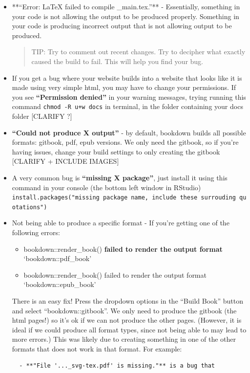 \documentclass[
]{book}
\providecommand{\tightlist}{%
  \setlength{\itemsep}{0pt}\setlength{\parskip}{0pt}}
\theoremstyle{definition}
\theoremstyle{definition}
\theoremstyle{definition}
\theoremstyle{definition}
\theoremstyle{remark}
\begin{document}
\begin{itemize}
\item
  **``Error: LaTeX failed to compile \_main.tex.''** - Essentially, something in your code is not allowing the output to be produced properly. Something in your code is producing incorrect output that is not allowing output to be produced.

  \begin{quote}
  TIP: Try to comment out recent changes. Try to decipher what exactly caused the build to fail. This will help you find your bug.
  \end{quote}
\item
  If you get a bug where your website builds into a website that looks like it is made using very simple html, you may have to change your permissions. If you see \textbf{``Permission denied''} in your warning messages, trying running this command \texttt{chmod\ -R\ u+w\ docs} in terminal, in the folder containing your docs folder {[}CLARIFY ?{]}
\item
  \textbf{``Could not produce X output''} - by default, bookdown builds all possible formats: gitbook, pdf, epub versions. We only need the gitbook, so if you're having issues, change your build settings to only creating the gitbook {[}CLARIFY + INCLUDE IMAGES{]}
\item
  A very common bug is \textbf{``missing X package''}, just install it using this command in your console (the bottom left window in RStudio) \texttt{install.packages("missing\ package\ name,\ include\ these\ surrouding\ quotations")}
\item
  Not being able to produce a specific format - If you're getting one of the following errors:

  \begin{itemize}
  \tightlist
  \item
    bookdown::render\_book() \textbf{failed to render the output format} `bookdown::pdf\_book'
  \item
    bookdown::render\_book() failed to render the output format `bookdown::epub\_book'
  \end{itemize}

  There is an easy fix! Press the dropdown options in the ``Build Book'' button and select ``bookdown::gitbook''. We only need to produce the gitbook (the html pages!) so it's ok if we can not produce the other pages. (However, it is ideal if we could produce all format types, since not being able to may lead to more errors.) This was likely due to creating something in one of the other formats that does not work in that format. For example:

\begin{verbatim}
  - **"File '..._svg-tex.pdf' is missing."** is a bug that
\end{verbatim}
\end{itemize}
\end{document}
